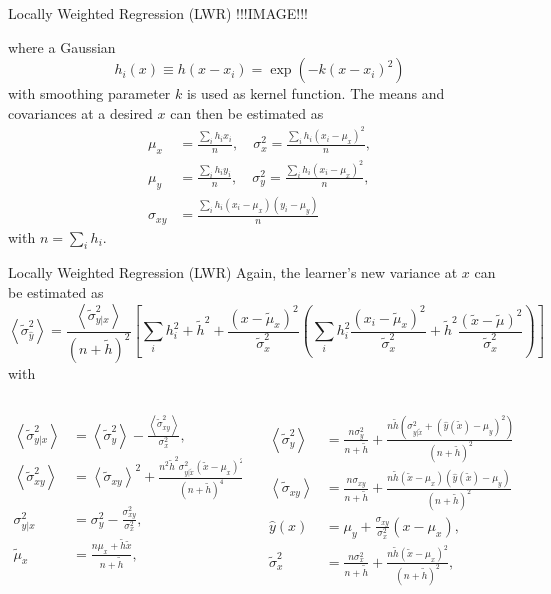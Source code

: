 \documentclass{beamer}
\newcommand{\xt}{\tilde{x}}
\newcommand{\hht}{\tilde{h}}
\newcommand{\st}{\tilde{\sigma}}
\newcommand{\mut}{\tilde{\mu}}
\newcommand{\E}[1]{\left< #1 \right>}
\begin{document}
\begin{frame}{Locally Weighted Regression (LWR)}
!!!IMAGE!!!

where a Gaussian
\begin{equation}
h_i(x) \equiv h(x-x_i) = \exp(-k(x-x_i)^2)
\end{equation}
with smoothing parameter $k$ is used as kernel function.
The means and covariances at a desired $x$ can then be estimated as
\begin{equation}\begin{split}
  \mu_x &= \frac{\sum_i h_ix_i}{n}, \quad
  \sigma_x^2 = \frac{\sum_i h_i(x_i-\mu_x)^2}{n}, \\
  \mu_y &= \frac{\sum_i h_iy_i}{n}, \quad
  \sigma_y^2 = \frac{\sum_i h_i(x_i-\mu_x)^2}{n}, \\
  \sigma_{xy} &= \frac{\sum_i h_i(x_i-\mu_x)(y_i-\mu_y)}{n}
\end{split}\end{equation}
with $n = \sum_i h_i$.
\end{frame}

\begin{frame}{Locally Weighted Regression (LWR)}
\footnotesize
Again, the learner's new variance at $x$ can be estimated as
\begin{equation}
\E{\st_{\hat{y}}^2} = \frac{\E{\st_{y|x}^2}}{(n+\hht)^2}
\left[ \sum_i h_i^2 + \hht^2 + \frac{(x-\mut_x)^2}{\st_x^2}
\left( \sum_i h_i^2 \frac{(x_i - \mut_x)^2}{\st_x^2} +
\hht^2 \frac{(\xt-\mut)^2}{\st_x^2} \right) \right]
\end{equation}
with

\tiny
\begin{columns}[t]
\begin{column}{0.45\textwidth}
\[\begin{split}
\E{\st_{y|x}^2} &= \E{\st_{y}^2} - \frac{\E{\st_{xy}^2}}{\sigma_{x}^2},\\
\E{\st_{xy}^2} &= \E{\st_{xy}}^2 +
\frac{n^2\hht^2\sigma_{y|\xt}^2(\xt-\mu_{x})^2}{(n+\hht)^4},\\
\sigma_{y|x}^2 &= \sigma_{y}^2 - \frac{\sigma_{xy}^2}{\sigma_{x}^2},\\
\mut_x &= \frac{n\mu_x+\hht\xt}{n+\hht},
\end{split}\]
\end{column}
\begin{column}{0.55\textwidth}
\[\begin{split}
\E{\st_{y}^2} &= \frac{n\sigma_{y}^2}{n+\hht} +
\frac{n\hht \left( \sigma_{y|\xt}^2 + (\hat{y}(\xt)-\mu_{y})^2 \right)}
{(n+\hht)^2}, \\
\E{\st_{xy}} &= \frac{n\sigma_{xy}}{n+\hht} +
\frac{n \hht (\xt-\mu_{x})(\hat{y}(\xt)-\mu_{y})}{(n+\hht)^2},\\
\hat{y}(x) &= \mu_{y} + \frac{\sigma_{xy}}{\sigma_{x}^2}(x-\mu_{x}),\\
\st_{x}^2 &= \frac{n\sigma_{x}^2}{n+\hht} +
\frac{n \hht (\xt-\mu_{x})^2}{(n+\hht)^2},\\
\end{split}\]
\end{column}
\end{columns}
\end{frame}
\end{document}
